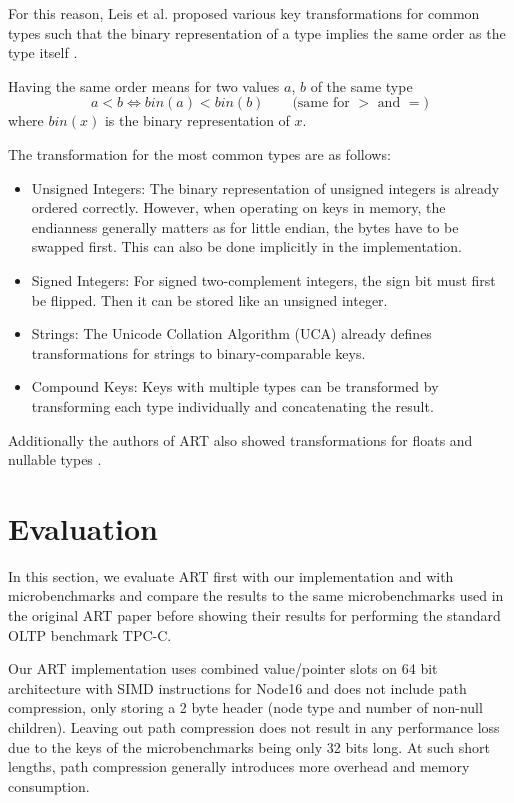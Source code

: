 \documentclass[acmtog, nonacm]{acmart}
\begin{document}
For this reason, Leis et al. proposed various key transformations for common types such that the binary 
representation of a type implies the same order as the type itself \cite{6544812}.

Having the same order means for two values $a$, $b$ of the same type
\[a < b \iff bin(a) <bin(b)\qquad\text{(same for $>$ and $=$)}\]
where $bin(x)$ is the binary representation of $x$.

The transformation for the most common types are as follows:
\begin{itemize}
    \item Unsigned Integers: The binary representation of unsigned integers is already ordered correctly. 
    However, when operating on keys in memory, the endianness generally matters as for little endian, the bytes 
    have to be swapped first. This can also be done implicitly in the implementation.
    \item Signed Integers: For signed two-complement integers, the sign bit must first be flipped. Then it can be 
    stored like an unsigned integer.
    \item Strings: The Unicode Collation Algorithm (UCA) already defines transformations for strings to 
    binary-comparable keys.
    \item Compound Keys: Keys with multiple types can be transformed by transforming each type individually and 
    concatenating the result.
\end{itemize}

Additionally the authors of ART also showed transformations for floats and nullable types \cite{6544812}.

\section{Evaluation}

In this section, we evaluate ART first with our implementation and with microbenchmarks and compare the
results to the same microbenchmarks used in the original ART paper before showing their results for performing the
standard OLTP benchmark TPC-C.

Our ART implementation \cite{fritschart} uses combined value/pointer slots on 64 bit architecture with SIMD instructions for Node16 
and does not include path compression, only storing a 2 byte header (node type and number of non-null children).
Leaving out path compression does not result in any performance loss due to the keys of the microbenchmarks
being only 32 bits long. At such short lengths, path compression generally introduces more overhead and memory consumption.
\end{document}
